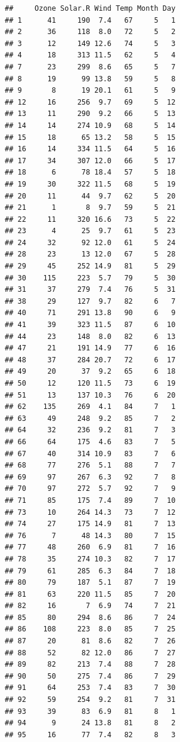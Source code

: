 \documentclass[
]{book}
\begin{document}
\begin{verbatim}
##     Ozone Solar.R Wind Temp Month Day
## 1      41     190  7.4   67     5   1
## 2      36     118  8.0   72     5   2
## 3      12     149 12.6   74     5   3
## 4      18     313 11.5   62     5   4
## 7      23     299  8.6   65     5   7
## 8      19      99 13.8   59     5   8
## 9       8      19 20.1   61     5   9
## 12     16     256  9.7   69     5  12
## 13     11     290  9.2   66     5  13
## 14     14     274 10.9   68     5  14
## 15     18      65 13.2   58     5  15
## 16     14     334 11.5   64     5  16
## 17     34     307 12.0   66     5  17
## 18      6      78 18.4   57     5  18
## 19     30     322 11.5   68     5  19
## 20     11      44  9.7   62     5  20
## 21      1       8  9.7   59     5  21
## 22     11     320 16.6   73     5  22
## 23      4      25  9.7   61     5  23
## 24     32      92 12.0   61     5  24
## 28     23      13 12.0   67     5  28
## 29     45     252 14.9   81     5  29
## 30    115     223  5.7   79     5  30
## 31     37     279  7.4   76     5  31
## 38     29     127  9.7   82     6   7
## 40     71     291 13.8   90     6   9
## 41     39     323 11.5   87     6  10
## 44     23     148  8.0   82     6  13
## 47     21     191 14.9   77     6  16
## 48     37     284 20.7   72     6  17
## 49     20      37  9.2   65     6  18
## 50     12     120 11.5   73     6  19
## 51     13     137 10.3   76     6  20
## 62    135     269  4.1   84     7   1
## 63     49     248  9.2   85     7   2
## 64     32     236  9.2   81     7   3
## 66     64     175  4.6   83     7   5
## 67     40     314 10.9   83     7   6
## 68     77     276  5.1   88     7   7
## 69     97     267  6.3   92     7   8
## 70     97     272  5.7   92     7   9
## 71     85     175  7.4   89     7  10
## 73     10     264 14.3   73     7  12
## 74     27     175 14.9   81     7  13
## 76      7      48 14.3   80     7  15
## 77     48     260  6.9   81     7  16
## 78     35     274 10.3   82     7  17
## 79     61     285  6.3   84     7  18
## 80     79     187  5.1   87     7  19
## 81     63     220 11.5   85     7  20
## 82     16       7  6.9   74     7  21
## 85     80     294  8.6   86     7  24
## 86    108     223  8.0   85     7  25
## 87     20      81  8.6   82     7  26
## 88     52      82 12.0   86     7  27
## 89     82     213  7.4   88     7  28
## 90     50     275  7.4   86     7  29
## 91     64     253  7.4   83     7  30
## 92     59     254  9.2   81     7  31
## 93     39      83  6.9   81     8   1
## 94      9      24 13.8   81     8   2
## 95     16      77  7.4   82     8   3

\end{verbatim}
\end{document}
